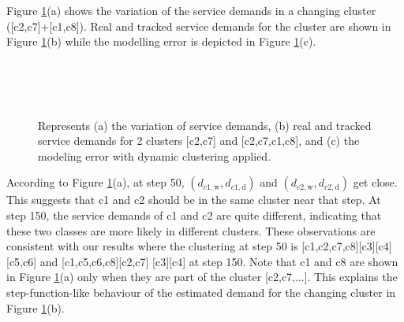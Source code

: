 Figure \ref{fig:tracked-demands}(a) shows the variation of the service demands in a changing cluster ([c2,c7]+[c1,c8]). Real and tracked service demands for the cluster are shown in Figure \ref{fig:tracked-demands}(b) while the modelling error is depicted in Figure \ref{fig:tracked-demands}(c). 
 \begin{figure}
	\centering
	  \\
	 \\
	 \\
	\caption[An estimation case study: service demands, clusters, and modeling error.]
	{Represents (a) the variation of service demands,
		(b) real and tracked service demands for 2 clusters [c2,c7] and [c2,c7,c1,c8], 
		and (c) the modeling error with dynamic clustering applied.  }
	\label{fig:tracked-demands}
\end{figure}

According to Figure \ref{fig:tracked-demands}(a),  at step 50, $(d_{c1,\text{w}},d_{c1,\text{d}})$ and $(d_{c2,\text{w}},d_{c2,\text{d}})$ get close. This suggests that c1 and c2 should be in the same cluster near that step. At step 150, the service demands of c1 and c2 are quite different, indicating that these two classes are more likely in different clusters. These observations are consistent with our results where the clustering at step 50 is [c1,c2,c7,c8][c3][c4][c5,c6] and [c1,c5,c6,c8][c2,c7] [c3][c4] at step 150. Note that c1 and c8 are shown in Figure \ref{fig:tracked-demands}(a) only when they are part of the cluster [c2,c7,...]. This explains the step-function-like behaviour of the estimated demand for the changing cluster in Figure \ref{fig:tracked-demands}(b).

